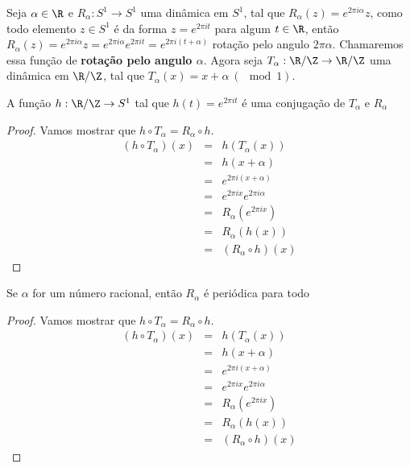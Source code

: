 Seja $\alpha\in\R$ e $R_{\alpha}:S^1\to S^1$ uma dinâmica em $S^1$, tal que $R_{\alpha}(z)=e^{2\pi i\alpha}z$, como todo elemento $z\in S^1$ é da forma $z=e^{2\pi it}$ para algum $t\in \R$, então $R_{\alpha}(z)=e^{2\pi i\alpha}z=e^{2\pi i\alpha}e^{2\pi it}=e^{2\pi i(t+\alpha)}$ rotação pelo angulo $2\pi\alpha$. Chamaremos essa função de \textbf{rotação pelo angulo $\alpha$}. Agora seja $T_{\alpha}:\R/\Z\to \R/\Z$ uma dinâmica em $\R/\Z$, tal que $T_{\alpha}(x)=x+\alpha\ (\mod 1)$.

\begin{proposicao} A função $h:\R/\Z\to S^1$ tal que $h(t)=e^{2\pi it}$ é uma conjugação de $T_{\alpha}$ e $R_{\alpha}$

\end{proposicao}

\begin{proof} Vamos mostrar que $h\circ T_{\alpha}=R_{\alpha}\circ h$.
\begin{eqnarray*}
(h\circ T_{\alpha})(x) & = & h(T_{\alpha}(x))\\
 & = & h(x+\alpha)\\
 & = & e^{2\pi i(x+\alpha)}\\
 & = & e^{2\pi ix}e^{2\pi i\alpha}\\
 & = & R_{\alpha}(e^{2\pi ix})\\
 & = & R_{\alpha}(h(x))\\
 & = & (R_{\alpha}\circ h)(x)
\end{eqnarray*}
\end{proof}

\begin{proposicao} Se $\alpha$ for um número racional, então $R_{\alpha}$ é periódica para todo 

\end{proposicao}

\begin{proof} Vamos mostrar que $h\circ T_{\alpha}=R_{\alpha}\circ h$.
\begin{eqnarray*}
(h\circ T_{\alpha})(x) & = & h(T_{\alpha}(x))\\
 & = & h(x+\alpha)\\
 & = & e^{2\pi i(x+\alpha)}\\
 & = & e^{2\pi ix}e^{2\pi i\alpha}\\
 & = & R_{\alpha}(e^{2\pi ix})\\
 & = & R_{\alpha}(h(x))\\
 & = & (R_{\alpha}\circ h)(x)
\end{eqnarray*}
\end{proof}

















